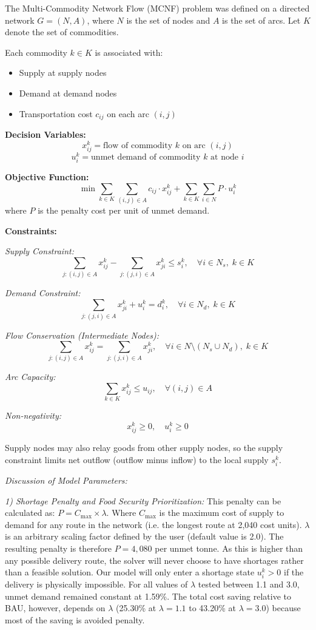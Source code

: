 \documentclass{icsthesis}
\begin{document}
\begin{mainmatter}
The Multi-Commodity Network Flow (MCNF) problem was defined on a directed network 
$G = (N, A)$, where $N$ is the set of nodes and $A$ is the set of arcs. Let $K$ denote the set of commodities.

Each commodity $k \in K$ is associated with:
\begin{itemize}
    \item Supply at supply nodes
    \item Demand at demand nodes
    \item Transportation cost $c_{ij}$ on each arc $(i,j)$
\end{itemize}

\textbf{Decision Variables:}
\[
x_{ij}^k = \text{flow of commodity } k \text{ on arc } (i,j)
\]
\[
u_i^k = \text{unmet demand of commodity } k \text{ at node } i
\]

\textbf{Objective Function:}
\[
\min \sum_{k \in K} \sum_{(i,j) \in A} c_{ij} \cdot x_{ij}^k 
+ \sum_{k \in K} \sum_{i \in N} P \cdot u_i^k
\]
where $P$ is the penalty cost per unit of unmet demand.

\textbf{Constraints:}

\textit{Supply Constraint:}
\[
\sum_{j:(i,j)\in A} x_{ij}^k - \sum_{j:(j,i)\in A} x_{ji}^k \le s_i^k, 
\quad \forall i \in N_s, \; k \in K
\]

\textit{Demand Constraint:}
\[
\sum_{j:(j,i)\in A} x_{ji}^k + u_i^k = d_i^k, 
\quad \forall i \in N_d, \; k \in K
\]

\textit{Flow Conservation (Intermediate Nodes):}
\[
\sum_{j:(i,j)\in A} x_{ij}^k = \sum_{j:(j,i)\in A} x_{ji}^k, 
\quad \forall i \in N \setminus (N_s \cup N_d), \; k \in K
\]

\textit{Arc Capacity:}
\[
\sum_{k \in K} x_{ij}^k \le u_{ij}, \quad \forall (i,j) \in A
\]

\textit{Non-negativity:}
\[
x_{ij}^k \ge 0, \quad u_i^k \ge 0
\]

Supply nodes may also relay goods from other supply nodes, so the supply constraint limits net outflow (outflow minus inflow) to the local supply $s_i^k$.

\textit{Discussion of Model Parameters:}

\textit{1) Shortage Penalty and Food Security Prioritization:} This penalty can be calculated as: $ P = C_{\max} \times \lambda $. Where $ C_{\max} $ is the maximum cost of supply to demand for any route in the network (i.e. the longest route at 2,040 cost units). $ \lambda $ is an arbitrary scaling factor defined by the user (default value is 2.0). The resulting penalty is therefore $ P = 4{,}080 $ per unmet tonne. As this is higher than any possible delivery route, the solver will never choose to have shortages rather than a feasible solution. Our model will only enter a shortage state $ u_i^k > 0 $ if the delivery is physically impossible. For all values of $\lambda$ tested between 1.1 and 3.0, unmet demand remained constant at 1.59\%. The total cost saving relative to BAU, however, depends on $\lambda$ (25.30\% at $\lambda=1.1$ to 43.20\% at $\lambda=3.0$) because most of the saving is avoided penalty.


\end{mainmatter}
\end{document}
